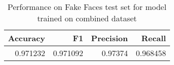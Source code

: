 \begin{table}
\centering
\caption{Performance on Fake Faces test set for model trained on combined dataset}
\label{vgg10-combined-fakefaces-metrics}
\begin{tabular}{rrrr}
\toprule
 Accuracy &        F1 &  Precision &    Recall \\
\midrule
 0.971232 &  0.971092 &    0.97374 &  0.968458 \\
\bottomrule
\end{tabular}
\end{table}


